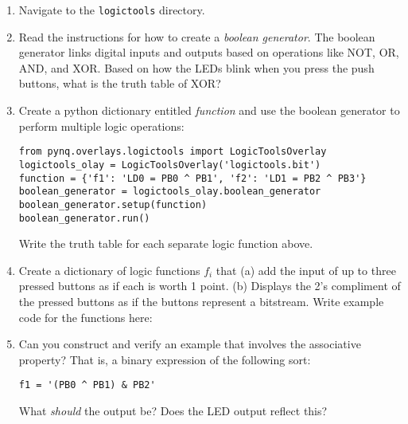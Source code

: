 \documentclass{article}
\begin{document}
\begin{enumerate}
\item Navigate to the \verb+logictools+ directory.
\item Read the instructions for how to create a \textit{boolean generator}.  The boolean generator links digital inputs and outputs based on operations like NOT, OR, AND, and XOR.  Based on how the LEDs blink when you press the push buttons, what is the truth table of XOR? \\ \vspace{2cm}
\item Create a python dictionary entitled \textit{function} and use the boolean generator to perform multiple logic operations:
\begin{verbatim}
from pynq.overlays.logictools import LogicToolsOverlay
logictools_olay = LogicToolsOverlay('logictools.bit')
function = {'f1': 'LD0 = PB0 ^ PB1', 'f2': 'LD1 = PB2 ^ PB3'}
boolean_generator = logictools_olay.boolean_generator
boolean_generator.setup(function)
boolean_generator.run()
\end{verbatim}
Write the truth table for each separate logic function above. \\ \vspace{1.5cm}
\item Create a dictionary of logic functions $f_i$ that (a) add the input of up to three pressed buttons as if each is worth 1 point.  (b) Displays the 2's compliment of the pressed buttons as if the buttons represent a bitstream. Write example code for the functions here: \\ \vspace{1.5cm}
\item Can you construct and verify an example that involves the associative property?  That is, a binary expression of the following sort:
\begin{verbatim}
f1 = '(PB0 ^ PB1) & PB2'
\end{verbatim}
What \textit{should} the output be?  Does the LED output reflect this? 
\end{enumerate}
\end{document}
